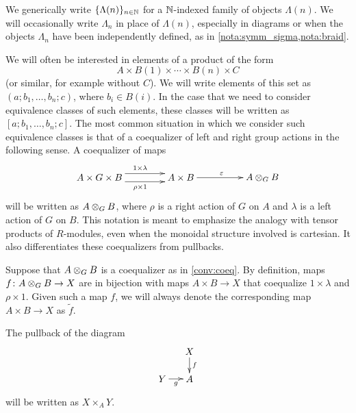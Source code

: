 \begin{conv}\label{conv:indexed}
We generically write $\{ \Lambda(n) \}_{n \in \N}$ for a $\N$-indexed family of objects $\Lambda(n)$. We will occasionally write $\Lambda_n$ in place of $\Lambda(n)$, especially in diagrams or when the objects $\Lambda_n$ have been independently defined, as in \cref{nota:symm_sigma,nota:braid}.
\end{conv}

\begin{conv}\label{conv:coeq}
We will often be interested in elements of a product of the form
\[
A \times B(1) \times \cdots \times B(n) \times C
\]
(or similar, for example without $C$). We will write elements of this set as $(a; b_{1}, \ldots, b_{n}; c)$, where $b_i \in B(i)$. 
In the case that we need to consider equivalence classes of such elements, these classes will be written as $[a; b_{1}, \ldots, b_{n}; c]$. 
The most common situation in which we consider such equivalence classes is that of a coequalizer of left and right group actions in the following sense. 
A coequalizer of maps
    \[
        \xy
            (0,0)*+{A \times G \times B}="00";
            (30,0)*+{A \times B}="10";
            (60,0)*+{\coeqb{A}{B}{G}}="20";
            {\ar@<1ex>^{1 \times \lambda} "00" ; "10"};
            {\ar@<-1ex>_{\rho \times 1} "00" ; "10"};
            {\ar^{\varepsilon} "10" ; "20"};
        \endxy
    \]
will be written as $\coeqb{A}{B}{G}$, where $\rho$ is a right action of $G$ on $A$ and $\lambda$ is a left action of $G$ on $B$. 
This notation is meant to emphasize the analogy with tensor products of $R$-modules, even when the monoidal structure involved is cartesian.
It also differentiates these coequalizers from pullbacks.
\end{conv}

\begin{conv}\label{conv:equiv-maps}
Suppose that $\coeqb{A}{B}{G}$ is a coequalizer as in \cref{conv:coeq}.
By definition, maps $f \colon \coeqb{A}{B}{G} \to X$ are in bijection with maps $A \times B \to X$ that coequalize $1 \times \lambda$ and $\rho \times 1$.
Given such a map $f$, we will always denote the corresponding map $A \times B \to X$ as $\tilde{f}$.
\end{conv}


\begin{conv}[(Pullbacks)]\label{conv:pb}
The pullback of the diagram
    \[
        \xy
            (10,0)*+{X}="00";
            (0,-10)*+{Y}="10";
            (10,-10)*+{A}="20";
            {\ar^{f} "00" ; "20"};
            {\ar_{g} "10" ; "20"};
        \endxy
    \]
will be written as $X \times_A Y$. 
\end{conv}

